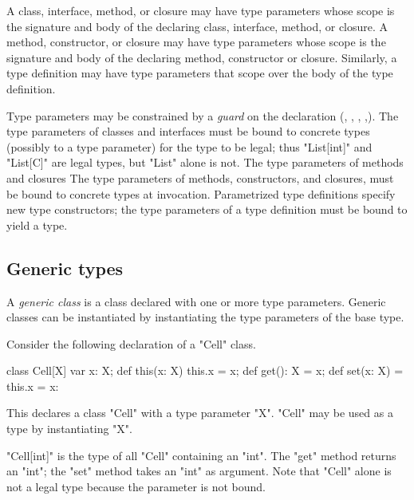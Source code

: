 \iftypeparams
        A class, interface, method, or closure may have type parameters
        whose scope is the signature and body of the declaring
        class, interface, method,
        or closure.
\else
        A method, constructor, or closure may have type parameters
        whose scope is the signature and body of the declaring method,
        constructor or closure.
\fi
        Similarly, a type definition may have
        type parameters that scope over the body of the type
        definition.

        Type parameters may be constrained by a {\em guard} on the declaration
        (, ,
\iftypeparams\else
        ,
\fi
        ,).
\iftypeparams
        The type parameters of classes and interfaces must be
        bound to concrete types (possibly to a type parameter)
        for the type to be legal; thus \xcd"List[int]" and
        \xcd"List[C]" are legal types, but \xcd"List" alone is
        not.
        The type parameters of
        methods and closures
\else
        The type parameters of
        methods, constructors, and closures,
\fi
        must be bound to
        concrete types at invocation.
        Parametrized type definitions specify new type
        constructors; the type parameters of a type definition must be bound
        to yield a type.

\iftypeparams

\subsection{Generic types}
\label{Generics}
        A {\em generic class} is a class
        declared with one or more type parameters.  Generic
        classes can be instantiated by instantiating the type
        parameters of the base type.

Consider the following declaration of a \xcd"Cell" class.
\begin{xten}
class Cell[X] {
    var x: X;
    def this(x: X) { this.x = x; }
    def get(): X = x;
    def set(x: X) = { this.x = x: }
}
\end{xten}

This declares a class \xcd"Cell" with a type parameter \xcd"X".
\xcd"Cell" may be used as a type by instantiating \xcd"X".

\xcd"Cell[int]" is the type of all \xcd"Cell" containing an
\xcd"int".  The \xcd"get" method returns an \xcd"int"; the
\xcd"set" method takes an \xcd"int" as argument.  Note that
\xcd"Cell" alone is not a legal type because the parameter is
not bound.

